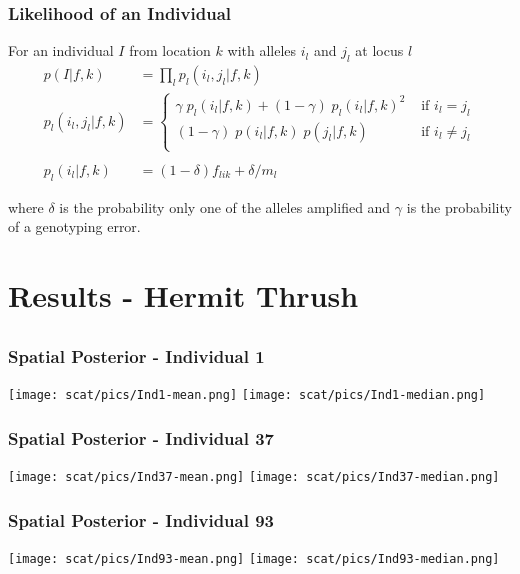 \begin{frame}
\frametitle{Likelihood of an Individual}
For an individual $I$ from location $k$ with alleles $i_l$ and $j_l$ at locus $l$
\begin{align*}
p(I | f,k) &= \prod_l p_l(i_l,j_l|f,k)\\
p_l(i_l,j_l|f,k) &= \begin{cases} 
\gamma \; p_l(i_l|f,k) + (1-\gamma) \; p_l(i_l|f,k)^2   & \text{ if } i_l = j_l \\
(1-\gamma) \; p(i_l|f,k) \; p(j_l|f,k)                  & \text{ if } i_l \neq j_l \\
\end{cases} \\\\
p_l(i_l|f,k) &= (1-\delta) f_{lik} + \delta / m_l
\end{align*}

where $\delta$ is the probability only one of the alleles amplified and $\gamma$ is the probability of a genotyping error.

\end{frame}



\section[Results]{Results - Hermit Thrush}
\subsection{}


\begin{frame}
\frametitle{Spatial Posterior - Individual 1}
\texttt{[image: scat/pics/Ind1-mean.png]}
\texttt{[image: scat/pics/Ind1-median.png]}
\end{frame}

\begin{frame}
\frametitle{Spatial Posterior - Individual 37}
\texttt{[image: scat/pics/Ind37-mean.png]}
\texttt{[image: scat/pics/Ind37-median.png]}
\end{frame}

\begin{frame}
\frametitle{Spatial Posterior - Individual 93}
\texttt{[image: scat/pics/Ind93-mean.png]}
\texttt{[image: scat/pics/Ind93-median.png]}
\end{frame}

